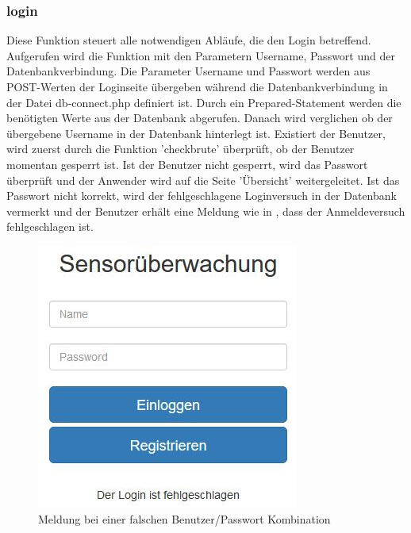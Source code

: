 \subsubsection{login}
Diese Funktion steuert alle notwendigen Abläufe, die den Login betreffend.\\
Aufgerufen wird die Funktion mit den Parametern Username, Passwort und der Datenbankverbindung. Die Parameter Username und Passwort werden aus POST-Werten der Loginseite übergeben während die Datenbankverbindung in der Datei db-connect.php definiert ist. Durch ein Prepared-Statement werden die benötigten Werte aus der Datenbank abgerufen. Danach wird verglichen ob der übergebene Username in der Datenbank hinterlegt ist. Existiert der Benutzer, wird zuerst durch die Funktion 'checkbrute' überprüft, ob der Benutzer momentan gesperrt ist. Ist der Benutzer nicht gesperrt, wird das Passwort überprüft und der Anwender wird auf die Seite 'Übersicht' weitergeleitet. Ist das Passwort nicht korrekt, wird der fehlgeschlagene Loginversuch in der Datenbank vermerkt und der Benutzer erhält eine Meldung wie in , dass der Anmeldeversuch fehlgeschlagen ist.

\begin{figure} [htb]
\begin{centering}
\includegraphics{Bilder/Kapitel4/login_fehlgeschlagen.jpg}
\caption[Meldung bei einer falschen Benutzer/Passwort Kombination]{Meldung bei einer falschen Benutzer/Passwort Kombination}
\label{computersaysno}
\end{centering}
\end{figure}

